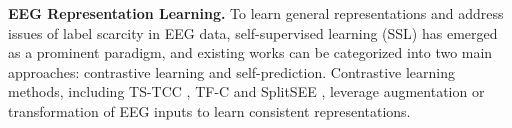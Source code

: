 
\noindent\textbf{EEG Representation Learning. } 
To learn general representations and address issues of label scarcity in EEG data, self-supervised learning (SSL) has emerged as a prominent paradigm, and existing works can be categorized into two main approaches: contrastive learning and self-prediction.
Contrastive learning methods, including TS-TCC \cite{eldele2021time}, TF-C \cite{zhang2022self} and SplitSEE \cite{kotoge2024splitsee}, leverage augmentation or transformation of EEG inputs to learn consistent representations. 
